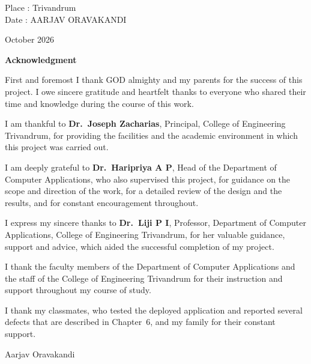 \documentclass[12pt,a4paper,oneside]{report}
\begin{document}
\vspace{43pt}
\noindent Place : Trivandrum\\
Date : \hfill AARJAV ORAVAKANDI
\clearpage
\begin{center}
October 2026
\end{center}
\clearpage
\clearpage
\begin{center}
\vspace*{-0.55cm}\vspace*{-7pt}
{\large\bfseries Acknowledgment\par}
\end{center}
\vspace{17pt}
{\setlength{\parskip}{3pt}\setlength{\parindent}{1.5em}%

First and foremost I thank GOD almighty and my parents for the success of this project. I owe sincere gratitude and heartfelt thanks to everyone who shared their time and knowledge during the course of this work.

I am thankful to \textbf{Dr.\ Joseph Zacharias}, Principal, College of Engineering Trivandrum, for providing the facilities and the academic environment in which this project was carried out.

I am deeply grateful to \textbf{Dr.\ Haripriya A P}, Head of the Department of Computer Applications, who also supervised this project, for guidance on the scope and direction of the work, for a detailed review of the design and the results, and for constant encouragement throughout.

I express my sincere thanks to \textbf{Dr.\ Liji P I}, Professor, Department of Computer Applications, College of Engineering Trivandrum, for her valuable guidance, support and advice, which aided the successful completion of my project.

I thank the faculty members of the Department of Computer Applications and the staff of the College of Engineering Trivandrum for their instruction and support throughout my course of study.

I thank my classmates, who tested the deployed application and reported several defects that are described in Chapter~6, and my family for their constant support.

}
\vspace{60pt}
\hfill Aarjav Oravakandi
\end{document}
